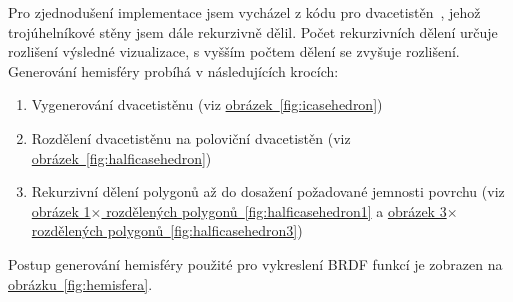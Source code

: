 \documentclass[czech,master]{diploma}
\begin{document}
Pro zjednodušení implementace jsem vycházel z kódu pro dvacetistěn~\cite{OpenGLSphere}, jehož trojúhelníkové stěny jsem dále rekurzivně dělil. Počet rekurzivních dělení určuje rozlišení výsledné vizualizace, s vyšším počtem dělení se zvyšuje rozlišení.
Generování hemisféry probíhá v následujících krocích:
\begin{enumerate}
  \item Vygenerování dvacetistěnu (viz \hyperref[fig:icasehedron]{obrázek~\ref{fig:icasehedron}})
  \item Rozdělení dvacetistěnu na poloviční dvacetistěn (viz \hyperref[fig:halficasehedron]{obrázek~\ref{fig:halficasehedron}})
  \item Rekurzivní dělení polygonů až do dosažení požadované jemnosti povrchu (viz \hyperref[fig:halficasehedron1]{obrázek 1\(\times\) rozdělených polygonů~\ref{fig:halficasehedron1}} a \hyperref[fig:halficasehedron3]{obrázek  3\(\times\) rozdělených polygonů~\ref{fig:halficasehedron3}})
\end{enumerate}
Postup generování hemisféry použité pro vykreslení BRDF funkcí je zobrazen na \hyperref[fig:hemisfera]{obrázku~\ref{fig:hemisfera}}.\par
\end{document}
